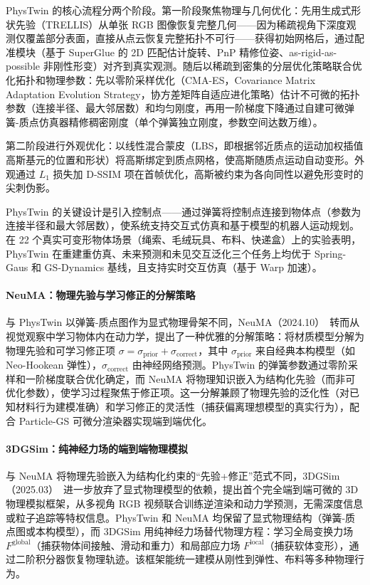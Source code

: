 PhysTwin 的核心流程分两个阶段。第一阶段聚焦物理与几何优化：先用生成式形状先验（TRELLIS）从单张 RGB 图像恢复完整几何——因为稀疏视角下深度观测仅覆盖部分表面，直接从点云恢复完整拓扑不可行——获得初始网格后，通过配准模块（基于 SuperGlue 的 2D 匹配估计旋转、PnP 精修位姿、as-rigid-as-possible 非刚性形变）对齐到真实观测。随后以稀疏到密集的分层优化策略联合优化拓扑和物理参数：先以零阶采样优化（CMA-ES，Covariance Matrix Adaptation Evolution Strategy，协方差矩阵自适应进化策略）估计不可微的拓扑参数（连接半径、最大邻居数）和均匀刚度，再用一阶梯度下降通过自建可微弹簧-质点仿真器精修稠密刚度（单个弹簧独立刚度，参数空间达数万维）。

第二阶段进行外观优化：以线性混合蒙皮（LBS，即根据邻近质点的运动加权插值高斯基元的位置和形状）将高斯绑定到质点网格，使高斯随质点运动自动变形。外观通过 $L_1$ 损失加 D-SSIM 项在首帧优化，高斯被约束为各向同性以避免形变时的尖刺伪影。

PhysTwin 的关键设计是引入控制点——通过弹簧将控制点连接到物体点（参数为连接半径和最大邻居数），使系统支持交互式仿真和基于模型的机器人运动规划。在 22 个真实可变形物体场景（绳索、毛绒玩具、布料、快递盒）上的实验表明，PhysTwin 在重建重仿真、未来预测和未见交互泛化三个任务上均优于 Spring-Gaus 和 GS-Dynamics 基线，且支持实时交互仿真（基于 Warp 加速）。

\paragraph{NeuMA：物理先验与学习修正的分解策略}

与 PhysTwin 以弹簧-质点图作为显式物理骨架不同，NeuMA（2024.10）~\cite{2410_08257}转而从视觉观察中学习物体内在动力学，提出了一种优雅的分解策略：将材质模型分解为物理先验和可学习修正项 $\sigma = \sigma_{\text{prior}} + \sigma_{\text{correct}}$，其中 $\sigma_{\text{prior}}$ 来自经典本构模型（如 Neo-Hookean 弹性），$\sigma_{\text{correct}}$ 由神经网络预测。PhysTwin 的弹簧参数通过零阶采样和一阶梯度联合优化确定，而 NeuMA 将物理知识嵌入为结构化先验（而非可优化参数），使学习过程聚焦于修正项。这一分解兼顾了物理先验的泛化性（对已知材料行为建模准确）和学习修正的灵活性（捕获偏离理想模型的真实行为），配合 Particle-GS 可微分渲染器实现端到端优化。

\paragraph{3DGSim：纯神经力场的端到端物理模拟}

与 NeuMA 将物理先验嵌入为结构化约束的``先验+修正''范式不同，3DGSim（2025.03）~\cite{2503_24009}进一步放弃了显式物理模型的依赖，提出首个完全端到端可微的 3D 物理模拟框架，从多视角 RGB 视频联合训练逆渲染和动力学预测，无需深度信息或粒子追踪等特权信息。PhysTwin 和 NeuMA 均保留了显式物理结构（弹簧-质点图或本构模型），而 3DGSim 用纯神经力场替代物理方程：学习全局变换力场 $F^{\text{global}}$（捕获物体间接触、滑动和重力）和局部应力场 $F^{\text{local}}$（捕获软体变形），通过二阶积分器恢复物理轨迹。该框架能统一建模从刚性到弹性、布料等多种物理行为。

